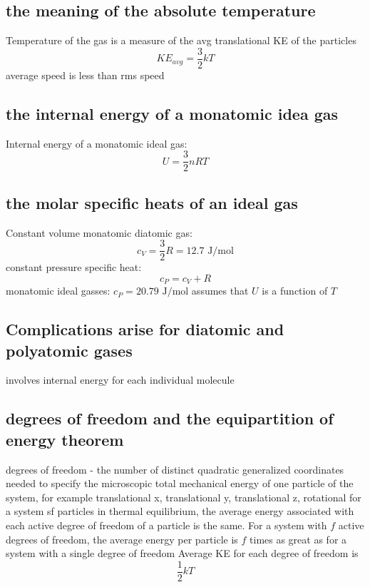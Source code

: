 \documentclass[twocolumn]{article}
\begin{document}
\subsection{the meaning of the absolute temperature}
\begin{outline}
\1 Temperature of the gas is a measure of the avg translational KE of the particles \[KE_{avg}=\dfrac{3}{2}kT\]
\1 average speed is less than rms speed
\end{outline}
\subsection{the internal energy of a monatomic idea gas}
\begin{outline}
\1 Internal energy of a monatomic ideal gas: \[U=\dfrac{3}{2}nRT\]
\end{outline}
\subsection{the molar specific heats of an ideal gas}
\begin{outline}
\1 Constant volume monatomic diatomic gas: \[c_V=\dfrac{3}{2}R=12.7\text{ J/mol}\]
\1 constant pressure specific heat: \[c_P=c_V+R\]
\2 monatomic ideal gasses: \(c_P=20.79\text{ J/mol}\)
\2 assumes that $U$ is a function of $T$
\end{outline}
\subsection{Complications arise for diatomic and polyatomic gases}
\begin{outline}
\1 involves internal energy for each individual molecule
\end{outline}
\subsection{degrees of freedom and the equipartition of energy theorem}
\begin{outline}
\1 degrees of freedom - the number of distinct quadratic generalized coordinates needed to specify the microscopic total mechanical energy of one particle of the system, for example translational x, translational y, translational z, rotational
\1 for a system sf particles in thermal equilibrium, the average energy associated with each active degree of freedom of a particle is the same. For a system with $f$ active degrees of freedom, the average energy per particle is $f$ times as great as for a system with a single degree of freedom
\1 Average KE for each degree of freedom is \[\dfrac{1}{2}kT\]
\end{outline}
\end{document}
